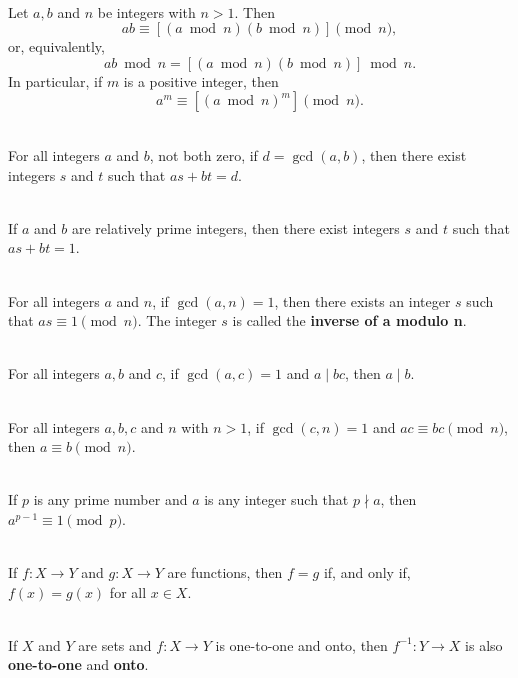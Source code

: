 \documentclass[12pt]{article}
\begin{document}
\begin{corollary}[8.4.4]
\hfill\\
\normalfont Let $a, b$ and $n$ be integers with $n > 1$. Then
\[ab \equiv [(a \bmod n)(b \bmod n)]\pmod{n},\]
or, equivalently,
\[ab \bmod n = [(a \bmod n)(b \bmod n)] \bmod n.\]
In particular, if $m$ is a positive integer, then
\[a^m \equiv [(a \bmod n)^m]\pmod{n}.\]
\end{corollary}
\begin{theorem}[8.4.5]
\hfill\\
\normalfont For all integers $a$ and $b$, not both zero, if $d = \gcd(a, b)$, then there exist integers $s$
and $t$ such that $as + bt = d$.
\end{theorem}
\begin{corollary}[8.4.6]
\hfill\\
\normalfont If $a$ and $b$ are relatively prime integers, then there exist integers $s$ and $t$ such that
$as + bt = 1$.
\end{corollary}
\begin{corollary}[8.4.7]
\hfill\\
\normalfont For all integers $a$ and $n$, if $\gcd(a, n) = 1$, then there exists an integer $s$ such that
$as \equiv 1 \pmod{n}$. The integer $s$ is called the \textbf{inverse of a modulo n}.
\end{corollary}
\begin{lemma}[8.4.8]
\hfill\\
\normalfont For all integers $a, b$ and $c$, if $\gcd(a, c) = 1$ and $a \mid bc$, then $a \mid b$.
\end{lemma}
\begin{theorem}[8.4.9]
\hfill\\
\normalfont For all integers $a, b, c$ and $n$ with $n>1$, if $\gcd(c, n) = 1$ and $ac \equiv bc \pmod{n}$, then
$a \equiv b \pmod{n}$.
\end{theorem}
\begin{theorem}[8.4.10]
\hfill\\
\normalfont If $p$ is any prime number and $a$ is any integer such that $p \nmid a$, then $a^{p-1} \equiv 1 \pmod{p}$.
\end{theorem}
\begin{theorem}[7.1.1]
\hfill\\
\normalfont If $f:X\to Y$ and $g:X\to Y$ are functions, then $f=g$ if, and only if, $f(x)=g(x)$ for all $x\in X$.
\end{theorem}
\begin{theorem}[7.2.3]
\hfill\\
\normalfont If $X$ and $Y$ are sets and $f:X\to Y$ is one-to-one and onto, then $f^{-1}:Y\to X$ is also \textbf{one-to-one} and \textbf{onto}.
\end{theorem}
\end{document}
